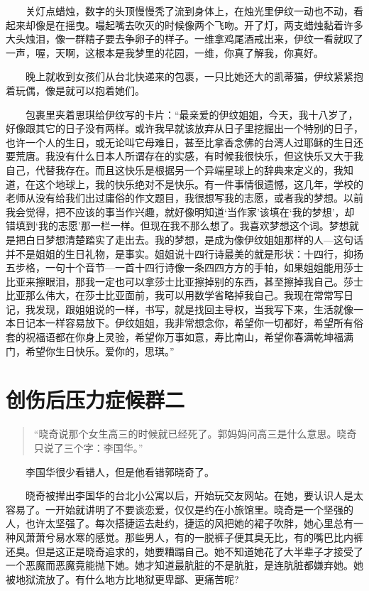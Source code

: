 \documentclass[12pt,UTF8]{ctexbook}
\begin{document}
　　关灯点蜡烛，数字的头顶慢慢秃了流到身体上，在烛光里伊纹一动也不动，看起来却像是在摇曳。嘬起嘴去吹灭的时候像两个飞吻。开了灯，两支蜡烛黏着许多大头烛泪，像一群精子要去争卵子的样子。一维拿鸡尾酒戒出来，伊纹一看就叹了一声，喔，天啊，这根本是我梦里的花园，一维，你真了解我，你真好。

　　晚上就收到女孩们从台北快递来的包裹，一只比她还大的凯蒂猫，伊纹紧紧抱着玩偶，像是就可以抱着她们。

　　包裹里夹着思琪给伊纹写的卡片：\enquote{最亲爱的伊纹姐姐，今天，我十八岁了，好像跟其它的日子没有两样。或许我早就该放弃从日子里挖掘出一个特别的日子，也许一个人的生日，或无论叫它母难日，甚至比拿香念佛的台湾人过耶稣的生日还要荒唐。我没有什么日本人所谓存在的实感，有时候我很快乐，但这快乐又大于我自己，代替我存在。而且这快乐是根据另一个异端星球上的辞典来定义的，我知道，在这个地球上，我的快乐绝对不是快乐。有一件事情很遗憾，这几年，学校的老师从没有给我们出过庸俗的作文题目，我很想写我的志愿，或者我的梦想。以前我会觉得，把不应该的事当作兴趣，就好像明知道`当作家'该填在`我的梦想'，却错填到`我的志愿'那一栏一样。但现在我不那么想了。我喜欢梦想这个词。梦想就是把白日梦想清楚踏实了走出去。我的梦想，是成为像伊纹姐姐那样的人---这句话并不是姐姐的生日礼物，是事实。姐姐说十四行诗最美的就是形状：十四行，抑扬五步格，一句十个音节---一首十四行诗像一条四四方方的手帕，如果姐姐能用莎士比亚来擦眼泪，那我一定也可以拿莎士比亚擦掉别的东西，甚至擦掉我自己。莎士比亚那么伟大，在莎士比亚面前，我可以用数学省略掉我自己。我现在常常写日记，我发现，跟姐姐说的一样，书写，就是找回主导权，当我写下来，生活就像一本日记本一样容易放下。伊纹姐姐，我非常想念你，希望你一切都好，希望所有俗套的祝福语都在你身上灵验，希望你万事如意，寿比南山，希望你春满乾坤福满门，希望你生日快乐。爱你的，思琪。}

\hypertarget{ux521bux4f24ux540eux538bux529bux75c7ux5019ux7fa4ux4e8c}{%
\section*{创伤后压力症候群二}\label{ux521bux4f24ux540eux538bux529bux75c7ux5019ux7fa4ux4e8c}}

\begin{quote}
\enquote{晓奇说那个女生高三的时候就已经死了。郭妈妈问高三是什么意思。晓奇只说了三个字：李国华。}
\end{quote}

　　李国华很少看错人，但是他看错郭晓奇了。

　　晓奇被撵出李国华的台北小公寓以后，开始玩交友网站。在她，要认识人是太容易了。一开始就讲明了不要谈恋爱，仅仅是约在小旅馆里。晓奇是一个坚强的人，也许太坚强了。每次搭捷运去赴约，捷运的风把她的裙子吹胖，她心里总有一种风萧萧兮易水寒的感觉。那些男人，有的一脱裤子便其臭无比，有的嘴巴比内裤还臭。但是这正是晓奇追求的，她要糟蹋自己。她不知道她花了大半辈子才接受了一个恶魔而恶魔竟能抛下她。她才知道最肮脏的不是肮脏，是连肮脏都嫌弃她。她被地狱流放了。有什么地方比地狱更卑鄙、更痛苦呢?
\end{document}
